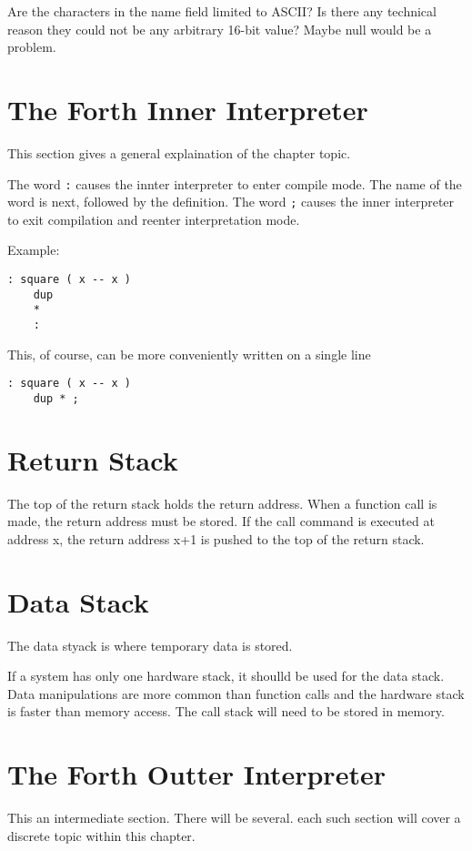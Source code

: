 Are the characters in the name field limited to ASCII? Is there any technical reason they
could not be any arbitrary 16-bit value? Maybe null would be a problem.

%
\section{The Forth Inner Interpreter}
This section gives a general explaination 
of the chapter topic.

The word \lstinline|:| causes the innter interpreter to enter compile mode. The name of the
word is next, followed by the definition. The word \lstinline|;| causes the inner
interpreter to exit compilation and reenter interpretation mode.

Example:
\begin{lstlisting}[caption={Definition of \lstinline|dup| in Forth.}]
: square ( x -- x )
    dup
    *
    :
\end{lstlisting}

This, of course, can be more conveniently written on a single line
\begin{lstlisting}[style=kaolstplain,linewidth=1.5\textwidth]
: square ( x -- x )
    dup * ;
\end{lstlisting}

\section{Return Stack}
The top of the return stack holds the return address. When a function call is made, the return address
must be stored.  If the call command is executed at address x, the return address x+1 is pushed to the top of the return stack.

\section{Data Stack}
The data styack is where temporary data is stored.

If a system has only one hardware stack, it shoulld be used for the data stack. Data 
manipulations are more common than function calls and the hardware stack is faster 
than memory access. The call stack will need to be stored in memory.

%
\section{The Forth Outter Interpreter}
This an intermediate section. There will be several. each such section will cover a
discrete topic within this chapter.


\blindtext
